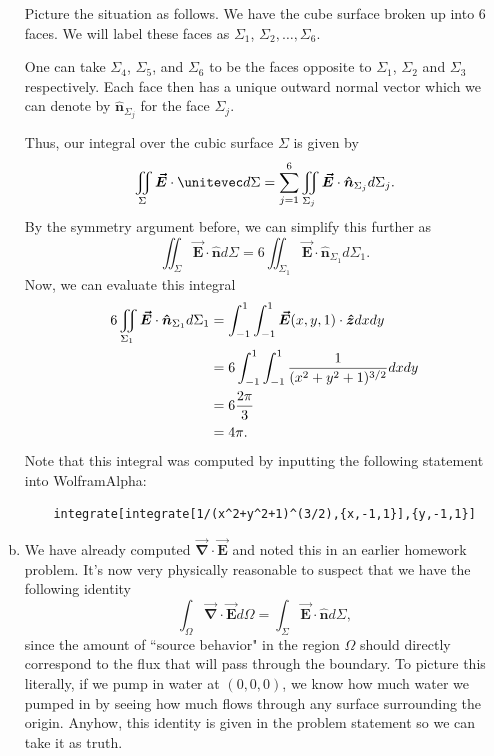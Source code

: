 \documentclass[12pt]{article} %
\newcommand{\grad}{\boldsymbol{\vec{\nabla}}}
\newcommand{\vecfieldE}{\boldsymbol{\vec{E}}}
\newcommand{\unitvec}{\boldsymbol{\hat{n}}}
\begin{document}
\begin{solution}
\begin{enumerate}[(a)]
        Picture the situation as follows. We have the cube surface broken up into $6$ faces. We will label these faces as $\Sigma_1$, $\Sigma_2,\dots,\Sigma_6$.  
        \begin{figure}[H]
        	\centering
        	\def\svgwidth{0.75\columnwidth}
        	
        \end{figure}
        One can take $\Sigma_4$, $\Sigma_5$, and $\Sigma_6$ to be the faces opposite to $\Sigma_1$, $\Sigma_2$ and $\Sigma_3$ respectively.  Each face then has a unique outward normal vector which we can denote by $\unitvec_{\Sigma_j}$ for the face $\Sigma_j$.
        \begin{figure}[H]
        	\centering
        	\def\svgwidth{0.75\columnwidth}
        	
        \end{figure}
        Thus, our integral over the cubic surface $\Sigma$ is given by
        \[
        \iint_{\Sigma} \vecfieldE \cdot \unitevec d\Sigma = \sum_{j=1}^6 \iint_{\Sigma_j} \vecfieldE \cdot \unitvec_{\Sigma_j}d\Sigma_j.
        \]
        By the symmetry argument before, we can simplify this further as
        \[
        \iint_\Sigma \vecfieldE \cdot \unitvec d\Sigma = 6 \iint_{\Sigma_1} \vecfieldE \cdot \unitvec_{\Sigma_1}d\Sigma_1.
        \]
        Now, we can evaluate this integral
        \begin{align*}
            6\iint_{\Sigma_1} \vecfieldE \cdot \unitvec_{\Sigma_1}d\Sigma_1 &= \int_{-1}^1 \int_{-1}^1 \vecfieldE(x,y,1) \cdot \zhat dxdy\\&= 6\int_{-1}^1 \int_{-1}^1 \frac{1}{(x^2+y^2+1)^{3/2}}dxdy\\
                &= 6\frac{2\pi }{3}\\
                &= 4\pi.
        \end{align*}
    Note that this integral was computed by inputting the following statement into WolframAlpha:
    \begin{verbatim}
    integrate[integrate[1/(x^2+y^2+1)^(3/2),{x,-1,1}],{y,-1,1}]
    \end{verbatim}

    \item We have already computed $\grad \cdot \vecfieldE$ and noted this in an earlier homework problem.  It's now very physically reasonable to suspect that we have the following identity
    \[
    \int_\Omega \grad \cdot \vecfieldE d\Omega = \int_\Sigma \vecfieldE \cdot \unitvec d\Sigma,
    \]
    since the amount of ``source behavior" in the region $\Omega$ should directly correspond to the flux that will pass through the boundary.  To picture this literally, if we pump in water at $(0,0,0)$, we know how much water we pumped in by seeing how much flows through any surface surrounding the origin. Anyhow, this identity is given in the problem statement so we can take it as truth.
    

\end{enumerate}
\end{solution}
\end{document}
